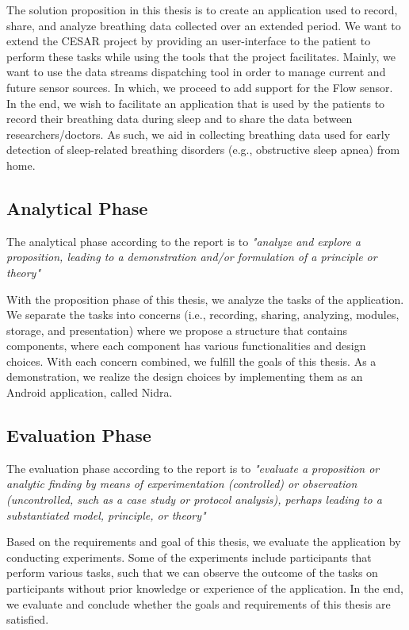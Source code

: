 The solution proposition in this thesis is to create an application used to record, share, and analyze breathing data collected over an extended period. We want to extend the CESAR project by providing an user-interface to the patient to perform these tasks while using the tools that the project facilitates. Mainly, we want to use the data streams dispatching tool in order to manage current and future sensor sources. In which, we proceed to add support for the Flow sensor. In the end, we wish to facilitate an application that is used by the patients to record their breathing data during sleep and to share the data between researchers/doctors. As such, we aid in collecting breathing data used for early detection of sleep-related breathing disorders (e.g., obstructive sleep apnea) from home. 

\subsection{Analytical Phase}
The analytical phase according to the report is to \textit{"analyze and explore a proposition, leading to a demonstration and/or formulation of a principle or theory"}

With the proposition phase of this thesis, we analyze the tasks of the application. We separate the tasks into concerns (i.e., recording, sharing, analyzing, modules, storage, and presentation) where we propose a structure that contains components, where each component has various functionalities and design choices. With each concern combined, we fulfill the goals of this thesis. As a demonstration, we realize the design choices by implementing them as an Android application, called Nidra. 

\subsection{Evaluation Phase}
The evaluation phase according to the report is to \textit{"evaluate a proposition or analytic finding by means of experimentation (controlled) or observation (uncontrolled, such as a case study or protocol analysis), perhaps leading to a substantiated model, principle, or theory"}

Based on the requirements and goal of this thesis, we evaluate the application by conducting experiments. Some of the experiments include participants that perform various tasks, such that we can observe the outcome of the tasks on participants without prior knowledge or experience of the application. In the end, we evaluate and conclude whether the goals and requirements of this thesis are satisfied.

